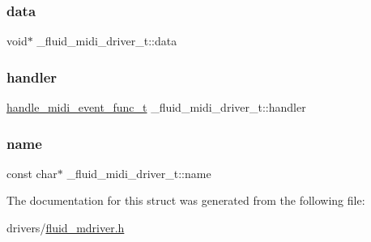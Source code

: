 \subsubsection{\texorpdfstring{data}{data}}
{\footnotesize\ttfamily void$\ast$ \+\_\+fluid\+\_\+midi\+\_\+driver\+\_\+t\+::data}

\mbox{\label{struct__fluid__midi__driver__t_a765f3fddfd189bdeb58515bd8eebf553}} 
\subsubsection{\texorpdfstring{handler}{handler}}
{\footnotesize\ttfamily \hyperlink{midi_8h_a42c3752e3adb54e0af802131c36a1129}{handle\+\_\+midi\+\_\+event\+\_\+func\+\_\+t} \+\_\+fluid\+\_\+midi\+\_\+driver\+\_\+t\+::handler}

\mbox{\label{struct__fluid__midi__driver__t_a8fed06378561925282de8b1da4b48df6}} 
\subsubsection{\texorpdfstring{name}{name}}
{\footnotesize\ttfamily const char$\ast$ \+\_\+fluid\+\_\+midi\+\_\+driver\+\_\+t\+::name}



The documentation for this struct was generated from the following file\+:\begin{DoxyCompactItemize}
\item 
drivers/\hyperlink{fluid__mdriver_8h}{fluid\+\_\+mdriver.\+h}\end{DoxyCompactItemize}
